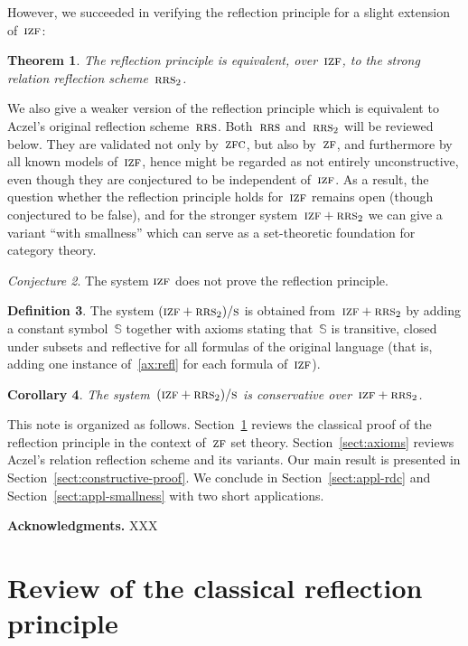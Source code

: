 \documentclass[oneside,reqno]{amsart}
\theoremstyle{definition}
\newtheorem{defn}{Definition}[section]
\theoremstyle{plain}
\newtheorem{cor}[defn]{Corollary}
\newtheorem{thm}[defn]{Theorem}
\theoremstyle{remark}
\newtheorem{conjecture}[defn]{Conjecture}
\renewcommand{\SS}{\mathbb{S}}
\renewcommand{\_}{\mathpunct{.}\,}
\newcommand{\?}{\,{:}\,}
\newcommand{\ZF}{\textsc{zf}}
\newcommand{\IZF}{\textsc{izf}}
\newcommand{\ZFC}{\textsc{zfc}}
\newcommand{\RRS}{\textsc{rrs}}
\newcommand{\ES}{(\IZF+\RRS_2)/\textsc{s}}
\begin{document}
However, we succeeded in verifying the reflection principle for a slight
extension of~$\IZF$:

\begin{thm}The reflection principle is equivalent, over~$\IZF$, to the strong
relation reflection scheme~$\RRS_2$.\end{thm}

We also give a weaker version of the reflection principle which is equivalent
to Aczel's original reflection scheme~$\RRS$.
Both~$\RRS$ and~$\RRS_2$ will be reviewed below. They are validated not
only by~$\ZFC$, but also by~$\ZF$, and furthermore by
all known models of~$\IZF$, hence might be regarded as not entirely
unconstructive, even though they are conjectured to be independent of~$\IZF$. As a
result, the question whether the reflection principle holds for~$\IZF$ remains
open (though conjectured to be false), and for the stronger system~$\IZF+\RRS_2$
we can give a variant ``with smallness'' which can serve as a set-theoretic
foundation for category theory.

\begin{conjecture}The system $\IZF$ does not prove the reflection
principle.\end{conjecture}

\begin{defn}The system $\ES$ is obtained from~$\IZF+\RRS_2$ by
adding a constant symbol~$\SS$ together with axioms
stating that~$\SS$ is transitive, closed under subsets and reflective for all
formulas of the original language (that is, adding one instance
of~\eqref{ax:refl} for each formula of~$\IZF$).\end{defn}

\begin{cor}The system~$\ES$ is conservative
over~$\IZF+\RRS_2$.\end{cor}

This note is organized as follows. Section~\ref{sect:review} reviews the
classical proof of the reflection principle in the context of~$\ZF$ set theory.
Section~\ref{sect:axioms} reviews Aczel's relation reflection scheme and its
variants. Our main result is presented in Section~\ref{sect:constructive-proof}.
We conclude in Section~\ref{sect:appl-rdc} and
Section~\ref{sect:appl-smallness} with two short applications.

\textbf{Acknowledgments.} XXX


\section{Review of the classical reflection principle}
\label{sect:review}
\end{document}
